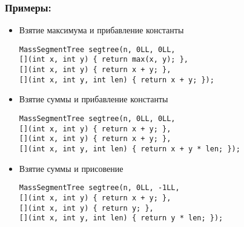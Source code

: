 \subsubsection{Примеры:}
\begin{itemize}
  \item Взятие максимума и прибавление константы
\begin{lstlisting}
MassSegmentTree segtree(n, 0LL, 0LL,
[](int x, int y) { return max(x, y); },
[](int x, int y) { return x + y; },
[](int x, int y, int len) { return x + y; });
\end{lstlisting}

  \item Взятие суммы и прибавление константы
\begin{lstlisting}
MassSegmentTree segtree(n, 0LL, 0LL,
[](int x, int y) { return x + y; },
[](int x, int y) { return x + y; },
[](int x, int y, int len) { return x + y * len; });
\end{lstlisting}

\item Взятие суммы и присовение
\begin{lstlisting}
MassSegmentTree segtree(n, 0LL, -1LL,
[](int x, int y) { return x + y; },
[](int x, int y) { return y; },
[](int x, int y, int len) { return y * len; });
\end{lstlisting}
\end{itemize}
